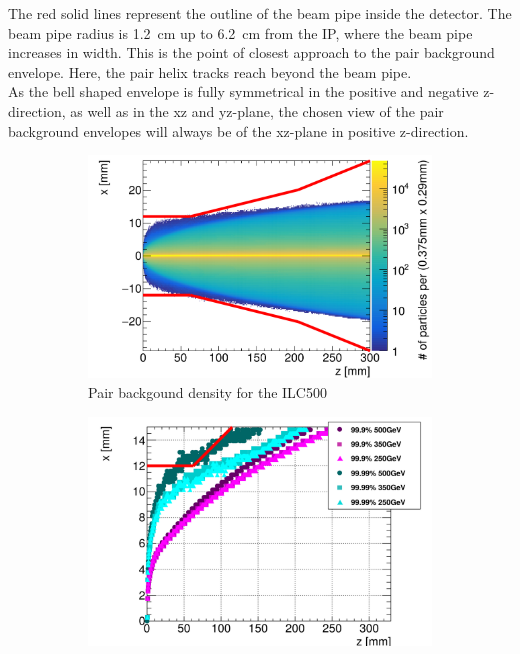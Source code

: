 The red solid lines represent the outline of the beam pipe inside the \sid detector.
The beam pipe radius is \SI{1.2}{\centi\meter} up to \SI{6.2}{\centi\meter} from the IP, where the beam pipe increases in width. 
This is the point of closest approach to the pair background envelope.
Here, the pair helix tracks reach beyond the beam pipe.
\\As the bell shaped envelope is fully symmetrical in the positive and negative z-direction, as well as in the xz and yz-plane, the chosen view of the pair background envelopes will always be of the xz-plane in positive z-direction.
 \begin{figure}
 \centering
  \begin{subfigure}[b]{0.49\textwidth}
   \centering
    \includegraphics[width=\textwidth]{Figures/Pairs/Helix_tracks_xz_80bunches_500GeV_5T.png}
   \caption{Pair backgound density for the ILC500}
   \end{subfigure}
   \hfill
    \begin{subfigure}[b]{0.49\textwidth}
   \centering
    \includegraphics[width=\textwidth]{Figures/Pairs/HelixEnvelopes_COMPARISON_xz_500_350_250_comparison_EDITED_2.png}

\end{subfigure}
\end{figure}
